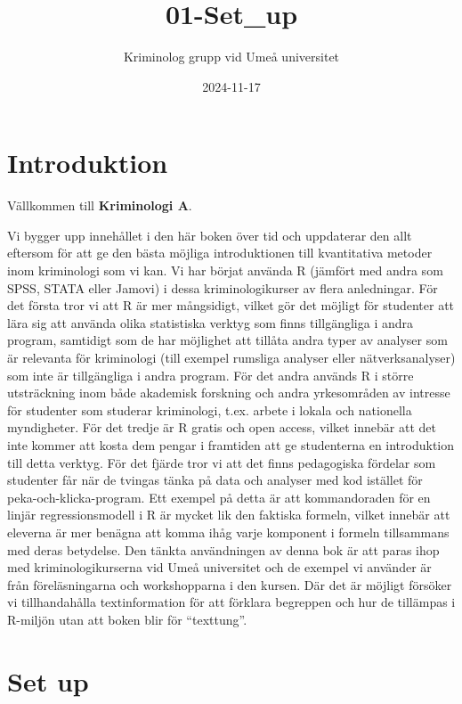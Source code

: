 \documentclass[
]{book}
\title{01-Set\_up}
\author{Kriminolog grupp vid Umeå universitet}
\date{2024-11-17}
\begin{document}
\maketitle

{
\setcounter{tocdepth}{1}
\tableofcontents
}
\chapter{Introduktion}\label{introduktion}

Vällkommen till \textbf{Kriminologi A}.

Vi bygger upp innehållet i den här boken över tid och uppdaterar den allt eftersom för att ge den bästa möjliga introduktionen till kvantitativa metoder inom kriminologi som vi kan. Vi har börjat använda R (jämfört med andra som SPSS, STATA eller Jamovi) i dessa kriminologikurser av flera anledningar. För det första tror vi att R är mer mångsidigt, vilket gör det möjligt för studenter att lära sig att använda olika statistiska verktyg som finns tillgängliga i andra program, samtidigt som de har möjlighet att tillåta andra typer av analyser som är relevanta för kriminologi (till exempel rumsliga analyser eller nätverksanalyser) som inte är tillgängliga i andra program. För det andra används R i större utsträckning inom både akademisk forskning och andra yrkesområden av intresse för studenter som studerar kriminologi, t.ex. arbete i lokala och nationella myndigheter. För det tredje är R gratis och open access, vilket innebär att det inte kommer att kosta dem pengar i framtiden att ge studenterna en introduktion till detta verktyg. För det fjärde tror vi att det finns pedagogiska fördelar som studenter får när de tvingas tänka på data och analyser med kod istället för peka-och-klicka-program. Ett exempel på detta är att kommandoraden för en linjär regressionsmodell i R är mycket lik den faktiska formeln, vilket innebär att eleverna är mer benägna att komma ihåg varje komponent i formeln tillsammans med deras betydelse. Den tänkta användningen av denna bok är att paras ihop med kriminologikurserna vid Umeå universitet och de exempel vi använder är från föreläsningarna och workshopparna i den kursen. Där det är möjligt försöker vi tillhandahålla textinformation för att förklara begreppen och hur de tillämpas i R-miljön utan att boken blir för ``texttung''.

\chapter{Set up}\label{set-up}
\end{document}
